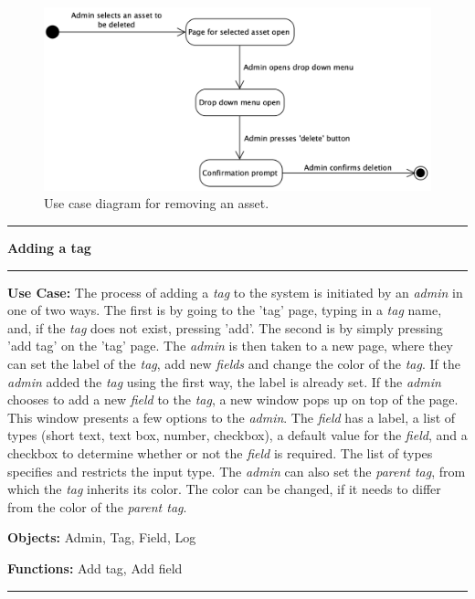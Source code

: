 \begin{figure}[H]
    \centering
    \includegraphics[width=1.0\textwidth]{figures/RemoveAsset.png}
    \caption{Use case diagram for removing an asset.}
    \label{fig:UseCaseRemoveAsset}
\end{figure}


\begin{use_case}[H]
    \hrule
    \vskip 0.3cm
    \Large
    \begin{center}
    
        \textbf{Adding a tag}
        
    \end{center}
    \vskip 0.1cm
    \hrule
    \vskip 0.2cm
    \normalsize
    
    \textbf{Use Case:} The process of adding a \textit{tag} to the system is initiated by an \textit{admin} in one of two ways. The first is by going to the 'tag' page, typing in a \textit{tag} name, and, if the \textit{tag} does not exist, pressing 'add'. The second is by simply pressing 'add tag' on the 'tag' page. The \textit{admin} is then taken to a new page, where they can set the label of the \textit{tag}, add new \textit{fields} and change the color of the \textit{tag}. If the \textit{admin} added the \textit{tag} using the first way, the label is already set. If the \textit{admin} chooses to add a new \textit{field} to the \textit{tag}, a new window pops up on top of the page. This window presents a few options to the \textit{admin}.
    \vskip 0.2cm
    The \textit{field} has a label, a list of types (short text, text box, number, checkbox), a default value for the \textit{field}, and a checkbox to determine whether or not the \textit{field} is required. The list of types specifies and restricts the input type.
    \vskip 0.2cm
    The \textit{admin} can also set the \textit{parent tag}, from which the \textit{tag} inherits its color. The color can be changed, if it needs to differ from the color of the \textit{parent tag}.
    
    \vskip 0.2cm
    
    \textbf{Objects:} Admin, Tag, Field, Log
    
    \vskip 0.2cm
    
    \textbf{Functions:} Add tag, Add field
    
    \vskip 0.4cm
    \hrule
    \vskip 0.2cm
    \caption{Adding a tag} \label{use_case:adding_a_tag}
\end{use_case}

